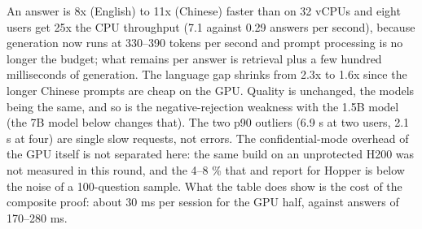 \documentclass[letterpaper,twocolumn,10pt]{article}
\begin{document}
An answer is 8x (English) to 11x (Chinese) faster than on 32 vCPUs and eight users get 25x the CPU throughput (7.1 against 0.29 answers per second), because generation now runs at 330--390 tokens per second and prompt processing is no longer the budget; what remains per answer is retrieval plus a few hundred milliseconds of generation. The language gap shrinks from 2.3x to 1.6x since the longer Chinese prompts are cheap on the GPU. Quality is unchanged, the models being the same, and so is the negative-rejection weakness with the 1.5B model (the 7B model below changes that). The two p90 outliers (6.9 s at two users, 2.1 s at four) are single slow requests, not errors. The confidential-mode overhead of the GPU itself is not separated here: the same build on an unprotected H200 was not measured in this round, and the 4--8 \% that \cite{chrapek2025confidential} and \cite{ibarra2025ccgpu} report for Hopper is below the noise of a 100-question sample. What the table does show is the cost of the composite proof: about 30 ms per session for the GPU half, against answers of 170--280 ms.
\end{document}
